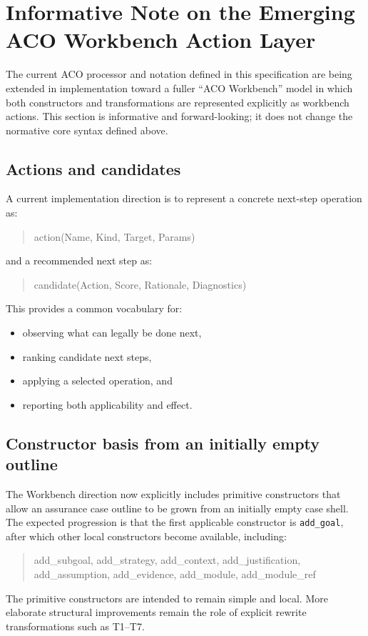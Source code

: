 \documentclass[11pt,twoside,a4paper]{article}
\begin{document}
\clearpage
\section{Informative Note on the Emerging ACO Workbench Action Layer}

The current ACO processor and notation defined in this specification are being extended in implementation toward a fuller ``ACO Workbench'' model in which both constructors and transformations are represented explicitly as workbench actions.
This section is informative and forward-looking; it does not change the normative core syntax defined above.

\subsection{Actions and candidates}

A current implementation direction is to represent a concrete next-step operation as:
\begin{quote}\ttfamily
action(Name, Kind, Target, Params)
\end{quote}
and a recommended next step as:
\begin{quote}\ttfamily
candidate(Action, Score, Rationale, Diagnostics)
\end{quote}
This provides a common vocabulary for:
\begin{itemize}[leftmargin=2em]
  \item observing what can legally be done next,
  \item ranking candidate next steps,
  \item applying a selected operation, and
  \item reporting both applicability and effect.
\end{itemize}

\subsection{Constructor basis from an initially empty outline}

The Workbench direction now explicitly includes primitive constructors that allow an assurance case outline to be grown from an initially empty case shell.
The expected progression is that the first applicable constructor is \texttt{add\_goal}, after which other local constructors become available, including:
\begin{quote}\ttfamily
add\_subgoal, add\_strategy, add\_context, add\_justification,\\
add\_assumption, add\_evidence, add\_module, add\_module\_ref
\end{quote}
The primitive constructors are intended to remain simple and local.
More elaborate structural improvements remain the role of explicit rewrite transformations such as T1--T7.
\end{document}
